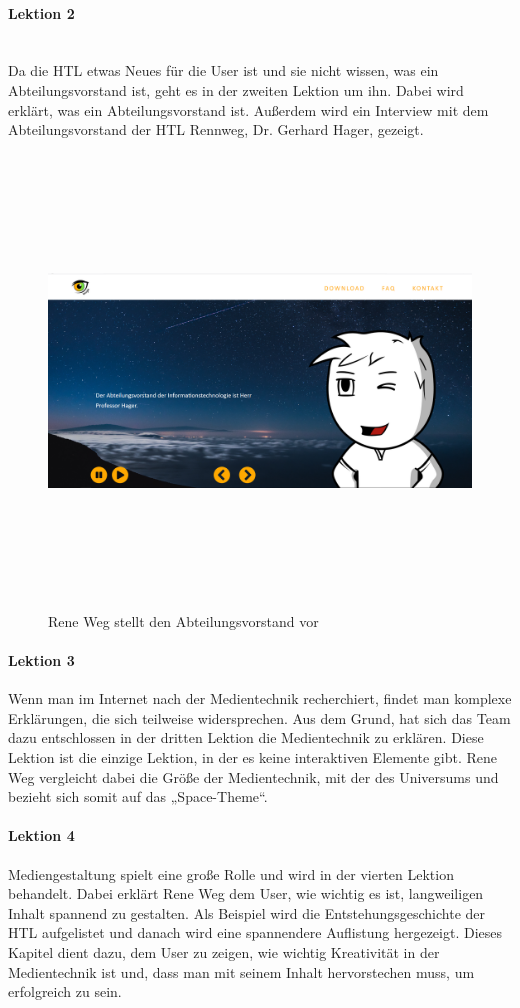 \paragraph{Lektion 2} \leavevmode \\
Da die HTL etwas Neues für die User ist und sie nicht wissen, was ein Abteilungsvorstand ist, geht es in der zweiten Lektion um ihn. Dabei wird erklärt, was ein Abteilungsvorstand ist. Außerdem wird ein Interview mit dem Abteilungsvorstand der HTL Rennweg, Dr. Gerhard Hager, gezeigt. 
\begin{figure} [H]
	\centering
\includegraphics[width=12cm,height=12cm,keepaspectratio]{webseite_abb13} 
	\caption{Rene Weg stellt den Abteilungsvorstand vor}
\end{figure}
\paragraph{Lektion 3}
Wenn man im Internet nach der Medientechnik recherchiert, findet man komplexe Erklärungen, die sich teilweise widersprechen. Aus dem Grund, hat sich das Team dazu entschlossen in der dritten Lektion die Medientechnik zu erklären. Diese Lektion ist die einzige Lektion, in der es keine interaktiven Elemente gibt. Rene Weg vergleicht dabei die Größe der Medientechnik, mit der des Universums und bezieht sich somit auf das „Space-Theme“. 

\paragraph{Lektion 4}
Mediengestaltung spielt eine große Rolle und wird in der vierten Lektion behandelt. Dabei erklärt Rene Weg dem User, wie wichtig es ist, langweiligen Inhalt spannend zu gestalten. Als Beispiel wird die Entstehungsgeschichte der HTL aufgelistet und danach wird eine spannendere Auflistung hergezeigt. Dieses Kapitel dient dazu, dem User zu zeigen, wie wichtig Kreativität in der Medientechnik ist und, dass man mit seinem Inhalt hervorstechen muss, um erfolgreich zu sein.

